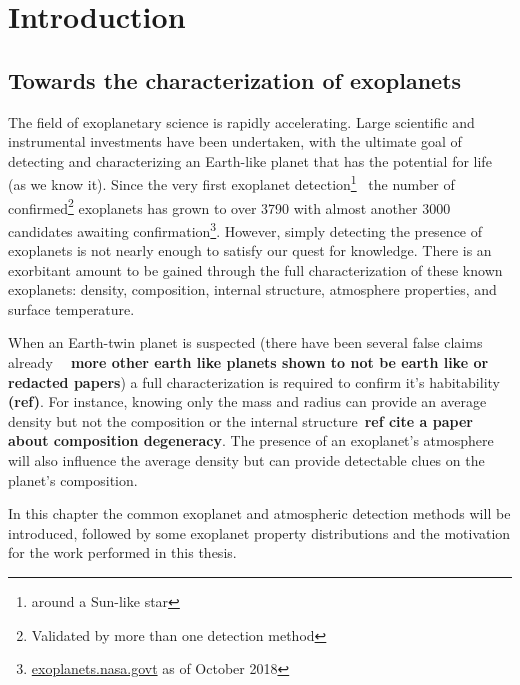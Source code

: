 
\chapter{Introduction}\label{cha:introduction}

\section{Towards the characterization of exoplanets}

The field of exoplanetary science is rapidly accelerating. Large scientific and instrumental investments have been undertaken, with the ultimate goal of detecting and characterizing an Earth-like planet that has the potential for life (as we know it).
Since the very first exoplanet detection\footnote{around a Sun-like star}~\citep{mayor_jupitermass_1995} the number of confirmed\footnote{Validated by more than one detection method} exoplanets has grown to over 3790 with almost another 3000 candidates awaiting confirmation\footnote{\href{https://exoplanets.nasa.gov/}{exoplanets.nasa.govt} as of October 2018}.
However, simply detecting the presence of exoplanets is not nearly enough to satisfy our quest for knowledge.
There is an exorbitant amount to be gained through the full characterization of these known exoplanets: density, composition, internal structure, atmosphere properties, and surface temperature.

When an Earth-twin planet is suspected (there have been several false claims already \textbf{~\citep[e.g.][]{mullally_kepler_2018} \textbf{more} other earth like planets shown to not be earth like or redacted papers}) a full characterization is required to confirm it's habitability \textbf{(ref)}.
For instance, knowing only the mass and radius can provide an average density but not the composition or the internal structure~\textbf{ref cite {a paper about composition degeneracy}}.
The presence of an exoplanet's atmosphere will also influence the average density but can provide detectable clues on the planet's composition.

In this chapter the common exoplanet and atmospheric detection methods will be introduced, followed by some exoplanet property distributions and the motivation for the work performed in this thesis.\\












